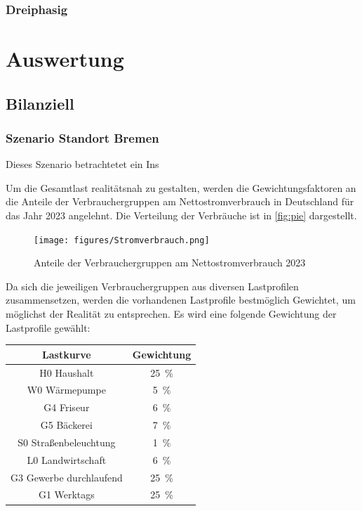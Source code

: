 \subsection{Dreiphasig}\label{3phase}


\chapter{Auswertung}

\section{Bilanziell}




\subsection{Szenario Standort Bremen}

Dieses Szenario betrachtetet ein Ins

Um die Gesamtlast realitätsnah zu gestalten, werden die Gewichtungsfaktoren an die Anteile der Verbrauchergruppen am Nettostromverbrauch in Deutschland für das Jahr 2023 angelehnt. Die Verteilung der Verbräuche ist in \autoref{fig:pie} dargestellt.

\begin{figure}[H]
	\centering
	\texttt{[image: figures/Stromverbrauch.png]}
	\caption{Anteile der Verbrauchergruppen am Nettostromverbrauch 2023}
	\label{fig:pie}
\end{figure}

Da sich die jeweiligen Verbrauchergruppen aus diversen Lastprofilen zusammensetzen, werden die vorhandenen Lastprofile bestmöglich Gewichtet, um möglichst der Realität zu entsprechen. Es wird eine folgende Gewichtung der Lastprofile gewählt:

\begin{center}
	\begin{tabular}[htpb]{c|c}
		\textbf{Lastkurve} & \textbf{Gewichtung} \\
		\hline
		H0 Haushalt & 25~\% \\
		W0 Wärmepumpe & 5~\% \\
		G4 Friseur & 6~\% \\
		G5 Bäckerei & 7~\% \\
		S0 Straßenbeleuchtung & 1~\% \\
		L0 Landwirtschaft & 6~\% \\
		G3 Gewerbe durchlaufend & 25~\% \\
		G1 Werktags & 25~\% 
	\end{tabular}
\end{center}

